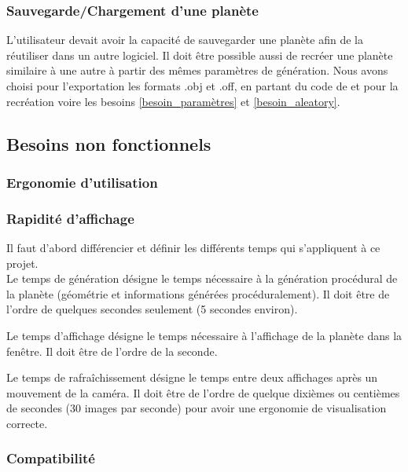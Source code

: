 \documentclass[a4paper]{article}
\begin{document}
\subsubsection{Sauvegarde/Chargement d'une planète}

L’utilisateur devait avoir la capacité de sauvegarder une planète afin de la réutiliser dans un autre logiciel. Il doit être possible aussi de recréer une planète similaire à une autre à partir des mêmes paramètres de génération. Nous avons choisi pour l'exportation les formats .obj et .off, en partant du code de \cite{TD_3D} et pour la recréation voire les besoins \ref{besoin_paramètres} et \ref{besoin_aleatory}.

\subsection{Besoins non fonctionnels}


\subsubsection{Ergonomie d'utilisation}

\subsubsection{Rapidité d'affichage}
Il faut d'abord différencier et définir les différents temps qui s'appliquent à ce projet. \\
     
Le temps de génération désigne le temps nécessaire à la génération procédural de la planète (géométrie et informations générées procéduralement). Il doit être de l'ordre de quelques secondes seulement (5 secondes environ).
         
Le temps d'affichage désigne le temps nécessaire à l'affichage de la planète dans la fenêtre. Il doit être de l'ordre de la seconde.
         
Le temps de rafraîchissement désigne le temps entre deux affichages après un mouvement de la caméra. Il doit être de l'ordre de quelque dixièmes ou centièmes de secondes (30 images par seconde) pour avoir une ergonomie de visualisation correcte.
        
\subsubsection{Compatibilité} \label{Compatibilité}
        
\end{document}
